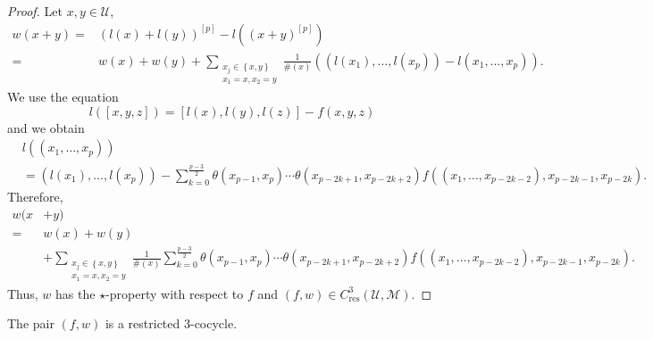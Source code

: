 \documentclass[11pt, twoside]{article}
\begin{document}
\begin{proof}
    
Let $x,y\in \mathcal{U}$, \begin{align*}
    w(x+y)=& (l(x)+l(y))^{[p]}- l((x+y)^{[p]})\\ =& w(x)+w(y) +  \sum_{\substack{x_j\in \left\{x,y \right\}\\x_1=x,x_2=y}}\frac{1}{\#(x)}((l(x_1),\ldots,l(x_p))-l(x_1,\ldots,x_p)).
\end{align*} We use the equation $$l([x,y,z])= [l(x),l(y),l(z)]-f(x,y,z) $$ and we obtain  \begin{align*}
    &l((x_1,\ldots,x_p))\\ &= (l(x_1),\ldots,l(x_p))-\sum\limits_{k=0}^{\frac{p-3}{2}}\theta(x_{p-1},x_p)\cdots\theta(x_{p-2k+1},x_{p-2k+2})f((x_1,\ldots,x_{p-2k-2}),x_{p-2k-1},x_{p-2k}).
\end{align*} Therefore, \begin{align*}
    w(x&+y)\\=&w(x)+w(y)\\ &+ \sum_{\substack{x_j\in \left\{x,y \right\}\\x_1=x,x_2=y}}\frac{1}{\#(x)} \sum\limits_{k=0}^{\frac{p-3}{2}}\theta(x_{p-1},x_p)\cdots\theta(x_{p-2k+1},x_{p-2k+2})f((x_1,\ldots,x_{p-2k-2}),x_{p-2k-1},x_{p-2k}).
\end{align*} Thus, $w $ has the $\star$-property with respect to $f$ and $(f,w)\in C^3_\mathrm{res}(\mathcal{U},\mathcal{M}) $.
\end{proof}

\begin{prop}
  The pair $(f,w)$ is a restricted $3$-cocycle.
\end{prop}
\end{document}
